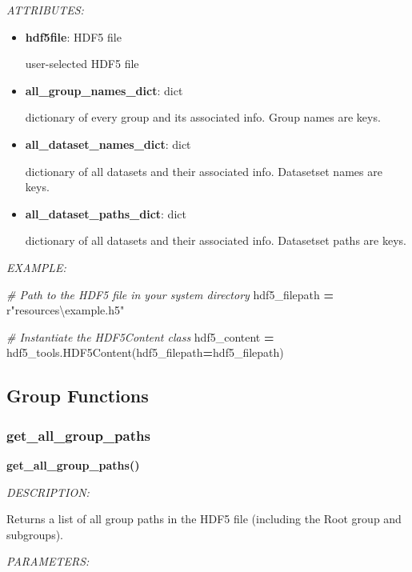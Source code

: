 \documentclass[
]{article}
\newenvironment{Shaded}{\begin{snugshade}}{\end{snugshade}}
\newcommand{\CommentTok}[1]{\textcolor[rgb]{0.56,0.35,0.01}{\textit{#1}}}
\newcommand{\NormalTok}[1]{#1}
\newcommand{\OperatorTok}[1]{\textcolor[rgb]{0.81,0.36,0.00}{\textbf{#1}}}
\newcommand{\VerbatimStringTok}[1]{\textcolor[rgb]{0.31,0.60,0.02}{#1}}
\begin{document}
\emph{ATTRIBUTES:}

\begin{itemize}
\item
  \textbf{hdf5file}: HDF5 file

  user-selected HDF5 file
\item
  \textbf{all\_group\_names\_dict}: dict

  dictionary of every group and its associated info. Group names are keys.
\item
  \textbf{all\_dataset\_names\_dict}: dict

  dictionary of all datasets and their associated info. Datasetset names are keys.
\item
  \textbf{all\_dataset\_paths\_dict}: dict

  dictionary of all datasets and their associated info. Datasetset paths are keys.
\end{itemize}

\emph{EXAMPLE:}

\begin{Shaded}
\begin{Highlighting}[]
\CommentTok{# Path to the HDF5 file in your system directory}
\NormalTok{hdf5_filepath }\OperatorTok{=} \VerbatimStringTok{r"resources\textbackslash{}example.h5"}

\CommentTok{# Instantiate the HDF5Content class}
\NormalTok{hdf5_content }\OperatorTok{=}\NormalTok{ hdf5_tools.HDF5Content(hdf5_filepath}\OperatorTok{=}\NormalTok{hdf5_filepath)}
\end{Highlighting}
\end{Shaded}

\hypertarget{group-functions}{%
\subsection{Group Functions}\label{group-functions}}

\hypertarget{get_all_group_paths}{%
\subsubsection{get\_all\_group\_paths}\label{get_all_group_paths}}

\textbf{get\_all\_group\_paths()}

\emph{DESCRIPTION:}

Returns a list of all group paths in the HDF5 file (including the Root group and subgroups).

\emph{PARAMETERS:}
\end{document}
